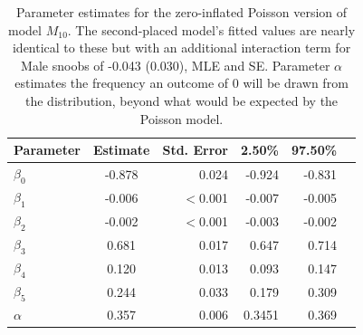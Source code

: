 \begin{table}[htbp]
  \centering
    \begin{tabular}{lcrrrr}
    \hline
    \hline
    Parameter & Estimate & Std. Error & 2.50\% & 97.50\% \\
    \hline
    $\beta_0$    & -0.878 & 0.024 & -0.924 & -0.831 \\
    $\beta_1$    & -0.006 & $<$0.001 & -0.007 & -0.005 \\
    $\beta_2$    & -0.002 & $<$0.001 & -0.003 & -0.002 \\
    $\beta_3$    & 0.681 & 0.017 & 0.647 & 0.714 \\
    $\beta_4$    & 0.120 & 0.013 & 0.093 & 0.147 \\
    $\beta_5$    & 0.244 & 0.033 & 0.179 & 0.309 \\
    $\alpha$ & 0.357 & 0.006 & 0.3451 & 0.369 \\
    \hline
    \end{tabular}%
    \caption{Parameter estimates for the zero-inflated Poisson version of model $M_{10}$.  The second-placed model's fitted values are nearly identical to these but with an additional interaction term for Male snoobs of -0.043 (0.030), MLE and SE.  Parameter $\alpha$ estimates the frequency an outcome of 0 will be drawn from the distribution, beyond what would be expected by the Poisson model.} 
  \label{tab:m10ests}%
\end{table}%

